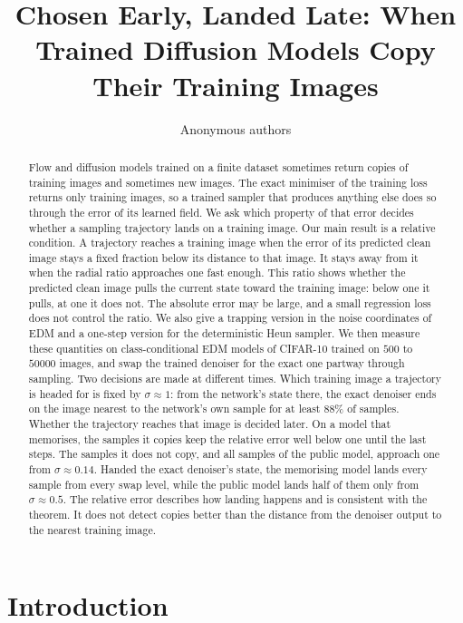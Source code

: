 \documentclass{article} %
\title{Chosen Early, Landed Late: When Trained Diffusion Models Copy Their Training Images}
\author{Anonymous authors}
\theoremstyle{plain}
\theoremstyle{definition}
\theoremstyle{remark}
\begin{document}
\maketitle
\raggedbottom

\begin{abstract}
Flow and diffusion models trained on a finite dataset sometimes return copies of training images
and sometimes new images. The exact minimiser of the training loss returns only training images,
so a trained sampler that produces anything else does so through the error of its learned field.
We ask which property of that error decides whether a sampling trajectory lands on a training
image. Our main result is a relative condition. A trajectory reaches a training image when the
error of its predicted clean image stays a fixed fraction below its distance to that image. It
stays away from it when the radial ratio approaches one fast enough. This ratio shows whether the
predicted clean image pulls the current state toward the training image: below one it pulls, at
one it does not. The absolute error may be large, and a small regression loss does not control the
ratio. We also give a trapping version in the noise coordinates of EDM and a one-step version for
the deterministic Heun sampler. We then measure these quantities on class-conditional EDM models
of CIFAR-10 trained on $500$ to $50000$ images, and swap the trained denoiser for the exact one
partway through sampling. Two decisions are made at different times. Which training image a
trajectory is headed for is fixed by $\sigma\approx1$: from the network's state there, the exact
denoiser ends on the image nearest to the network's own sample for at least $88\%$ of samples.
Whether the trajectory reaches that image is decided later. On a model that memorises, the samples
it copies keep the relative error well below one until the last steps. The samples it does not
copy, and all samples of the public model, approach one from $\sigma\approx0.14$. Handed the exact
denoiser's state, the memorising model lands every sample from every swap level, while the public
model lands half of them only from $\sigma\approx0.5$. The relative error describes how landing
happens and is consistent with the theorem. It does not detect copies better than the distance
from the denoiser output to the nearest training image.
\end{abstract}

\section{Introduction}
\label{sec:intro}
\end{document}
